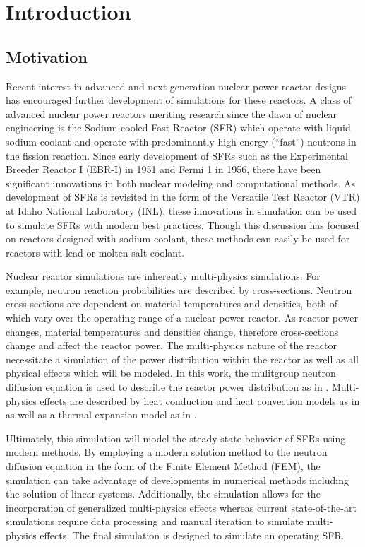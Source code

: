 \chapter{Introduction}
\label{ch:introduction}

\section{Motivation}
  Recent interest in advanced and next-generation nuclear power reactor designs
  has encouraged further development of simulations for these reactors. A class
  of advanced nuclear power reactors meriting research since the dawn 
  of nuclear engineering is the Sodium-cooled Fast Reactor (SFR) which operate
  with liquid sodium coolant and operate with predominantly high-energy 
  (``fast'') neutrons in the fission reaction. Since early development of SFRs 
  such as the Experimental
  Breeder Reactor I (EBR-I) in 1951 and Fermi 1 in 1956, there have been
  significant innovations in both nuclear modeling and computational methods. As
  development of SFRs is revisited in the form of the Versatile Test Reactor
  (VTR) at Idaho National Laboratory (INL), these innovations in simulation can
  be used to simulate SFRs with modern best practices.
  Though this discussion has focused on reactors designed with sodium coolant,
  these methods can easily be used for reactors with lead or molten salt
  coolant.

  Nuclear reactor simulations are inherently multi-physics simulations. For
  example, neutron reaction probabilities are described by cross-sections.
  Neutron cross-sections are dependent on material temperatures and densities,
  both of which vary over the operating range of a nuclear power reactor. As
  reactor power changes, material temperatures and densities change, therefore
  cross-sections change and affect the reactor power. The multi-physics nature
  of the reactor necessitate a simulation of the power distribution within the
  reactor as well as all physical effects which will be modeled. In this
  work, the mulitgroup neutron diffusion equation is used to describe the 
  reactor power distribution as in . Multi-physics 
  effects are described by heat conduction and heat convection models as in
   as well as a thermal expansion model as in
  .

  Ultimately, this simulation will model the steady-state behavior of SFRs using
  modern methods. By employing a modern solution method to the neutron diffusion
  equation in the form of the Finite Element Method (FEM), the simulation can
  take advantage of developments in numerical methods including the solution of
  linear systems. Additionally, the simulation allows for the incorporation of
  generalized multi-physics effects whereas current state-of-the-art simulations
  require data processing and manual iteration to simulate multi-physics 
  effects. The final simulation is designed to simulate an operating SFR.

